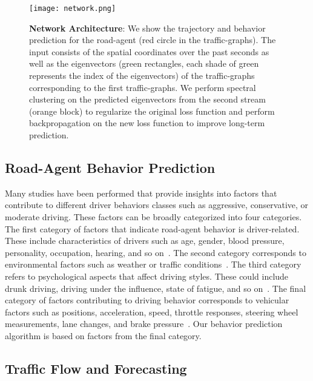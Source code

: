 \documentclass[10pt,twocolumn,letterpaper]{article}
\theoremstyle{plain}
\begin{document}
\begin{figure*}[t]
    \centering
    \texttt{[image: network.png]}
    \caption{\textbf{Network Architecture}: We show the trajectory and behavior prediction for the  road-agent (red circle in the traffic-graphs). The input consists of the spatial coordinates over the past  seconds as well as the eigenvectors (green rectangles, each shade of green represents the index of the eigenvectors) of the traffic-graphs corresponding to the first  traffic-graphs. We perform spectral clustering on the predicted eigenvectors from the second stream (orange block) to regularize the original loss function and perform backpropagation on the new loss function to improve long-term prediction.}
    \label{fig:network}
    \vspace{-10pt}
\end{figure*}

\subsection{Road-Agent Behavior Prediction}

Many studies have been performed that provide insights into factors that contribute to different driver behaviors classes such as aggressive, conservative, or moderate driving. These factors can be broadly categorized into four categories. The first category of factors that indicate road-agent behavior is driver-related. These include characteristics of drivers such as age, gender, blood pressure, personality, occupation, hearing, and so on~\cite{ernestref2, rohanref3, rohanref5, big5, ernestref9, ernestref10}. 
The second category corresponds to environmental factors such as weather or traffic conditions~\cite{behaviorref-category2-1,behaviorref-category2-2}.
The third category refers to psychological aspects that affect driving styles. These could include drunk driving, driving under the influence, state of fatigue, and so on~\cite{behaviorref-category3-2,behaviorref-category3-1}.
The final category of factors contributing to driving behavior corresponds to vehicular factors such as positions, acceleration, speed, throttle responses, steering wheel measurements, lane changes, and brake pressure~\cite{ernestref8,ernestref12, ernestref13,ernestref14,ernestref15, ernest, chandra2019graphrqi}. Our behavior prediction algorithm is based on factors from the final category.




\subsection{Traffic Flow and Forecasting}
\end{document}
